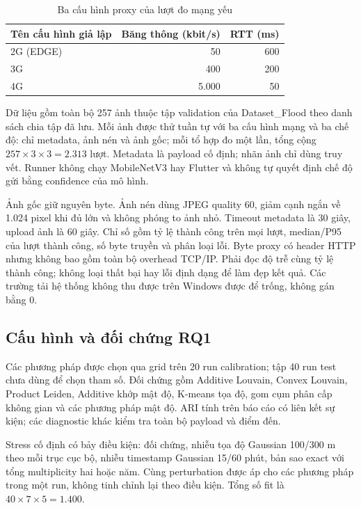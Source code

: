 \begin{table}[htbp]\centering
\caption{Ba cấu hình proxy của lượt đo mạng yếu}
\label{tab:weak-network-profiles}
\begin{tabular}{lrr}
\toprule Tên cấu hình giả lập & Băng thông (kbit/s) & RTT (ms) \\
\midrule
2G (EDGE) & 50 & 600 \\
3G & 400 & 200 \\
4G & 5.000 & 50 \\
\bottomrule
\end{tabular}
\end{table}
Dữ liệu gồm toàn bộ 257 ảnh thuộc tập validation của Dataset\_Flood theo danh sách chia tập đã lưu. Mỗi ảnh được thử tuần tự với ba cấu hình mạng và ba chế độ: chỉ metadata, ảnh nén và ảnh gốc; mỗi tổ hợp đo một lần, tổng cộng $257\times3\times3=2.313$ lượt. Metadata là payload cố định; nhãn ảnh chỉ dùng truy vết. Runner không chạy MobileNetV3 hay Flutter và không tự quyết định chế độ gửi bằng confidence của mô hình.

Ảnh gốc giữ nguyên byte. Ảnh nén dùng JPEG quality 60, giảm cạnh ngắn về 1.024 pixel khi đủ lớn và không phóng to ảnh nhỏ. Timeout metadata là 30 giây, upload ảnh là 60 giây. Chỉ số gồm tỷ lệ thành công trên mọi lượt, median/P95 của lượt thành công, số byte truyền và phân loại lỗi. Byte proxy có header HTTP nhưng không bao gồm toàn bộ overhead TCP/IP. Phải đọc độ trễ cùng tỷ lệ thành công; không loại thất bại hay lỗi định dạng để làm đẹp kết quả. Các trường tải hệ thống không thu được trên Windows được để trống, không gán bằng 0.

\subsection{Cấu hình và đối chứng RQ1}
Các phương pháp được chọn qua grid trên 20 run calibration; tập 40 run test chưa dùng để chọn tham số. Đối chứng gồm Additive Louvain, Convex Louvain, Product Leiden, Additive khớp mật độ, K-means tọa độ, gom cụm phân cấp không gian và các phương pháp mật độ. ARI tính trên báo cáo có liên kết sự kiện; các diagnostic khác kiểm tra toàn bộ payload và điểm đến.

Stress cố định có bảy điều kiện: đối chứng, nhiễu tọa độ Gaussian 100/300 m theo mỗi trục cục bộ, nhiễu timestamp Gaussian 15/60 phút, bản sao exact với tổng multiplicity hai hoặc năm. Cùng perturbation được áp cho các phương pháp trong một run, không tinh chỉnh lại theo điều kiện. Tổng số fit là $40\times7\times5=1.400$.

